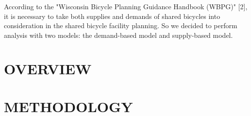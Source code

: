 \documentclass[journal, letterpaper]{IEEEtran}
\begin{document}

According to the "Wisconsin Bicycle Planning Guidance Handbook (WBPG)" [2], it is necessary to take both supplies and demands of shared bicycles into consideration in the shared bicycle facility planning. So we decided to perform analysis with two models: the demand-based model and supply-based model.

\section{OVERVIEW}
\large
\section{METHODOLOGY}
\large
\end{document}
